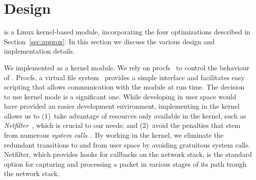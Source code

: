 \section{\oursys Design}\label{sec:design}
\oursys is a Linux kernel-based module, incorporating the four optimizations described in Section~\ref{sec:approx}. In this section we discuss the various design and implementation details. 

 We implemented \oursys as a kernel module. We rely on procfs~\cite{proc} to control the behaviour of \oursys. Procfs, a virtual file system~\cite{virtfs} provides a simple interface and facilitates easy scripting that allows communication with the module at run time.
The decision to use kernel mode is a significant one. While developing in user space would have provided an easier development environment, implementing \oursys in the kernel allows us to (1)~take advantage of resources only available in the kernel, such as \textit{Netfilter}~\cite{netfilter}, which is crucial to our needs; and (2)~avoid the penalties that stem from numerous \textit{system calls}~\cite{Copy, FlexSC}. By working in the kernel, we eliminate the redundant transitions to and from user space by avoiding gratuitous system calls. Netfilter, which provides hooks for callbacks on the network stack, is the standard option for capturing and processing a packet in various stages of its path trough the network stack.  


